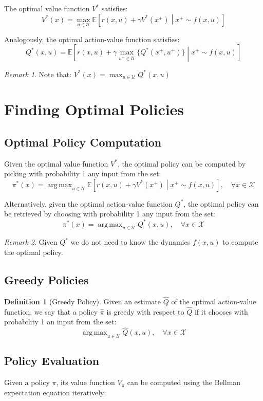 \documentclass[openany]{book}
\DeclareMathOperator*{\argmax}{arg\,max}  %
\theoremstyle{definition}
\newtheorem{definition}{Definition}[section]
\theoremstyle{remark}
\newtheorem*{remark}{Remark}
\begin{document}
The optimal value function $V^*$ satisfies:
\[
V^*(x) = \max_{u \in \mathcal{U}} \mathbb{E}\left[r(x, u) + \gamma V^*(x^+) \middle| x^+ \sim f(x, u)\right]
\]

Analogously, the optimal action-value function satisfies:
\[
Q^*(x, u) = \mathbb{E}\left[r(x, u) + \gamma \max_{u^+ \in \mathcal{U}}\{Q^*(x^+, u^+)\} \middle| x^+ \sim f(x, u)\right]
\]

\begin{remark}
Note that: $V^*(x) = \max_{u \in \mathcal{U}} Q^*(x, u)$
\end{remark}

\section{Finding Optimal Policies}

\subsection{Optimal Policy Computation}
Given the optimal value function $V^*$, the optimal policy can be computed by picking with probability 1 any input from the set:
\[
\pi^*(x) = \argmax_{u\in\mathcal{U}} \mathbb{E}\left[r(x,u) + \gamma V^*(x^+) \middle| x^+ \sim f(x,u)\right], \quad \forall x \in \mathcal{X}
\]

Alternatively, given the optimal action-value function $Q^*$, the optimal policy can be retrieved by choosing with probability 1 any input from the set:
\[
\pi^*(x) = \argmax_{u\in\mathcal{U}} Q^*(x,u), \quad \forall x \in \mathcal{X}
\]

\begin{remark}
Given $Q^*$ we do not need to know the dynamics $f(x,u)$ to compute the optimal policy.
\end{remark}

\subsection{Greedy Policies}
\begin{definition}[Greedy Policy]
Given an estimate $\hat{Q}$ of the optimal action-value function, we say that a policy $\hat{\pi}$ is greedy with respect to $\hat{Q}$ if it chooses with probability 1 an input from the set:
\[
\argmax_{u\in\mathcal{U}} \hat{Q}(x,u), \quad \forall x \in \mathcal{X}
\]
\end{definition}

\subsection{Policy Evaluation}
Given a policy $\pi$, its value function $V_\pi$ can be computed using the Bellman expectation equation iteratively:
\end{document}
